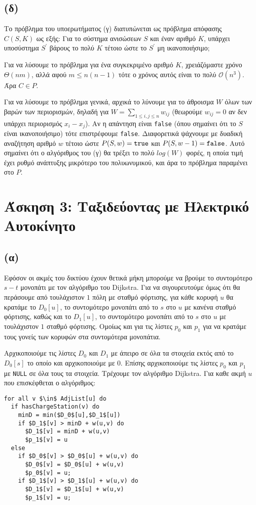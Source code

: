\documentclass[a4paper,11pt]{article}
\begin{document}
\subsection*{(δ)}
Το πρόβλημα του υποερωτήματος (γ) διατυπώνεται ως πρόβλημα απόφασης $C(S,K)$ ως εξής:
Για το σύστημα ανισώσεων $S$ και έναν αριθμό $Κ$, υπάρχει υποσύστημα $S^\prime$ βάρους το πολύ $K$ τέτοιο ώστε το $S^\prime$ μη ικανοποιήσιμο;

Για να λύσουμε το πρόβλημα για ένα συγκεκριμένο αριθμό $K$, χρειάζόμαστε χρόνο $\Theta(nm)$, αλλά αφού $m\leq n(n-1)$ τότε ο χρόνος αυτός είναι το πολύ $\mathcal{O}(n^3)$. Άρα $C \in P$.

Για να λύσουμε το πρόβλημα γενικά, αρχικά το λύνουμε για το άθροισμα $W$ όλων των βαρών των περιορισμών, δηλαδή για $W = \sum_{1 \leq i,j \leq n} w_{ij}$ (θεωρούμε $w_{ij}=0$ αν δεν υπάρχει περιορισμός $x_i-x_j$).
Αν η απάντηση είναι \verb|false| (όπου σημαίνει ότι το $S$ είναι ικανοποιήσιμο) τότε επιστρέφουμε \verb|false|.
Διαφορετικά ψάχνουμε με δυαδική αναζήτηση αριθμό $w$ τέτοιο ώστε $P(S,w) = \verb|true|$ και $P(S,w-1) = \verb|false|$.
Αυτό σημαίνει ότι ο αλγόριθμος του (γ) θα τρέξει το πολύ $log(W)$ φορές, η οποία τιμή έχει ρυθμό ανάπτυξης μικρότερο του πολυωνυμικού, και άρα το πρόβλημα παραμένει στο $P$.

\section*{Άσκηση 3: Ταξιδεύοντας με Ηλεκτρικό Αυτοκίνητο}

\subsection*{(α)}
Εφόσον οι ακμές του δικτύου έχουν θετικά μήκη μπορούμε να βρούμε το συντομότερο $s-t$ μονοπάτι με τον αλγόριθμο του Dijkstra.
Για να σιγουρευτούμε όμως ότι θα περάσουμε από τουλάχιστον $1$ πόλη με σταθμό φόρτισης, για κάθε κορυφή $u$ θα κρατάμε το $D_0[u]$, το συντομότερο μονοπάτι από το $s$ στο $u$ με κανένα σταθμό φόρτισης, καθώς και το $D_1[u]$, το συντομότερο μονοπάτι από το $s$ στο $u$ με τουλάχιστον $1$ σταθμό φόρτισης.
Ομοίως και για τις λίστες $p_0$ και $p_1$ για να κρατάμε τους γονείς των κορυφών στα συντομότερα μονοπάτια.

Αρχικοποιούμε τις λίστες $D_0$ και $D_1$ με άπειρο σε όλα τα στοιχεία εκτός από το $D_0[s]$ το οποίο και αρχικοποιούμε με $0$.
Επίσης αρχικοποιούμε τις λίστες $p_0$ και $p_1$ με \verb|NULL| σε όλα τους τα στοιχεία.
Τρέχουμε τον αλγόριθμο Dijkstra. Για καθε ακμή $u$ που επισκέφθεται ο αλγόριθμος:
\begin{lstlisting}
for all v $\in$ AdjList[u] do
  if hasChargeStation(v) do
    minD = min($D_0$[u],$D_1$[u])
    if $D_1$[v] > minD + w(u,v) do
      $D_1$[v] = minD + w(u,v)
      $p_1$[v] = u
  else
    if $D_0$[v] > $D_0$[u] + w(u,v) do
      $D_0$[v] = $D_0$[u] + w(u,v)
      $p_0$[v] = u;
    if $D_1$[v] > $D_1$[u] + w(u,v) do
      $D_1$[v] = $D_1$[u] + w(u,v) 
      $p_1$[v] = u; 
\end{lstlisting}
\end{document}
